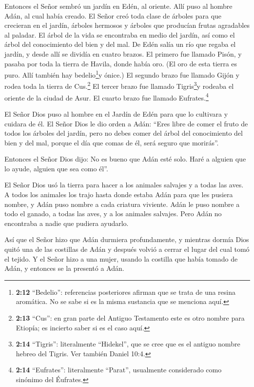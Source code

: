  Entonces el Señor sembró un jardín en Edén, al oriente.
Allí puso al hombre Adán, al cual había creado.  El Señor
creó toda clase de árboles para que crecieran en el jardín, árboles
hermosos y árboles que producían frutas agradables al paladar. El árbol
de la vida se encontraba en medio del jardín, así como el árbol del
conocimiento del bien y del mal.  De Edén salía un río que
regaba el jardín, y desde allí se dividía en cuatro brazos.
 El primero fue llamado Pisón, y pasaba por toda la tierra
de Havila, donde había oro.  (El oro de esta tierra es
puro. Allí también hay bedelio\footnote{\textbf{2:12} ``Bedelio'':
  referencias posteriores afirman que se trata de una resina aromática.
  No se sabe si es la misma sustancia que se menciona aquí.}y ónice.)
 El segundo brazo fue llamado Gijón y rodea toda la tierra
de Cus.\footnote{\textbf{2:13} ``Cus'': en gran parte del Antiguo
  Testamento este es otro nombre para Etiopía; es incierto saber si es
  el caso aquí.}  El tercer brazo fue llamado
Tigris\footnote{\textbf{2:14} ``Tigris'': literalmente ``Hidekel'', que
  se cree que es el antiguo nombre hebreo del Tigris. Ver también Daniel
  10:4.}y rodeaba el oriente de la ciudad de Asur. El cuarto brazo fue
llamado Eufrates.\footnote{\textbf{2:14} ``Eufrates'': literalmente
  ``Parat'', usualmente considerado como sinónimo del Éufrates.}

 El Señor Dios puso al hombre en el Jardín de Edén para que
lo cultivara y cuidara de él.  El Señor Dios le dio orden a
Adán: ``Eres libre de comer el fruto de todos los árboles del jardín,
 pero no debes comer del árbol del conocimiento del bien y
del mal, porque el día que comas de él, será seguro que morirás''.

 Entonces el Señor Dios dijo: No es bueno que Adán esté
solo. Haré a alguien que lo ayude, alguien que sea como él''.

 El Señor Dios usó la tierra para hacer a los animales
salvajes y a todas las aves. A todos los animales los trajo hasta donde
estaba Adán para que les pusiera nombre, y Adán puso nombre a cada
criatura viviente.  Adán le puso nombre a todo el ganado, a
todas las aves, y a los animales salvajes. Pero Adán no encontraba a
nadie que pudiera ayudarlo.

 Así que el Señor hizo que Adán durmiera profundamente, y
mientras dormía Dios quitó una de las costillas de Adán y después volvió
a cerrar el lugar del cual tomó el tejido.  Y el Señor hizo
a una mujer, usando la costilla que había tomado de Adán, y entonces se
la presentó a Adán.


